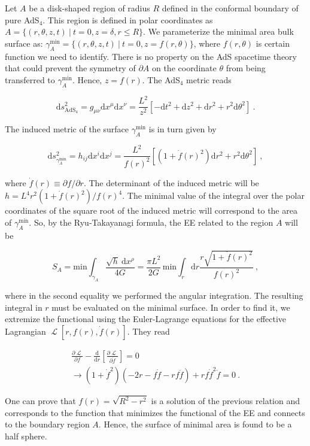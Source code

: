 \documentclass[twocolumn]{revtex4}
\providecommand{\eq}[2]{
    \begin{equation}
        #2
    \label{eq:#1}
    \end{equation}
}
\providecommand{\eqgat}[2]{
    \begin{gather}
        #2
    \label{eq:#1}
    \end{gather}
}
\DeclareMathOperator{\calL}{\mathcal{L}}
\begin{document}
Let $A$ be a disk-shaped region of radius $R$ defined in the conformal boundary of pure AdS$_4$. This region is defined in polar coordinates as
$
    A = \{ ( r, \theta, z, t ) \ | \ t = 0, z = \delta, r \le R \} 
$. 
We parameterize the minimal area bulk surface as:
$
    \gamma_A^\text{min} = \{ ( r, \theta, z, t ) \ | \ t = 0, z = f (r, \theta) \} %
$, 
where $f(r,\theta)$ is certain function we need to identify. There is no property on the AdS spacetime theory that could prevent the symmetry of $\partial A$ on the coordinate $\theta$ from being transferred to $\gamma_A^\text{min}$. Hence, $z=f(r)$.
The AdS$_4$ metric reads
\eq{1Ametric}{
    \mathrm{d}s^2_{\text{AdS}_4} = g_{\mu \nu} \mathrm{d}x^\mu \mathrm{d}x^\nu = 
    \frac{L^2}{z^2} [ -\mathrm{d}t^2 + \mathrm{d}z^2 + \mathrm{d}r^2 + r^2 \mathrm{d}\theta^2 ] \ . \nonumber
}
The induced metric of the surface $\gamma_A^\text{min}$ is in turn given by
\eq{1gammaAmetric}{
    \mathrm{d}s^2_{\gamma_A^\text{min}} = h_{i j} \mathrm{d}x^i \mathrm{d}x^j = 
    \frac{L^2}{f(r)^2} \left[ \left( 1+ \dot{f}(r)^2 \right) \mathrm{d}r^2 + r^2 \mathrm{d}\theta^2 \right] \ , \nonumber
}
where $ \dot{f}(r) \equiv \partial f/\partial r$. The determinant of the induced metric will be
$
    h = L^4 r^2 ( 1 + \dot{f}(r)^2 )/f(r)^4 
$.  
The minimal value of the integral over the polar coordinates of the square root of the induced metric will correspond to the area of $\gamma_A^\text{min}$. So, by the Ryu-Takayanagi formula, the EE related to the region $A$ will be
\eq{1EEA}{
    S_A = \text{min} \int_{\gamma_A}    \frac{\sqrt{h} \ \mathrm{d}x^\rho}{4G} = \frac{\pi L^2}{2G} \, \text{min} \int_r \mathrm{d}r \frac{r \sqrt{ 1 + \dot{f}(r)^2 }}{f(r)^2}  \ ,\nonumber
}
where in the second equality we performed the angular integration. The resulting integral in $r$ must be evaluated on the minimal surface. In order to find it, we extremize the functional using the 
Euler-Lagrange equations for the effective Lagrangian $\calL [r,f(r),\dot{f}(r)]$. They read
\eqgat{1EL}{
    \frac{\partial \calL}{\partial f} - \frac{\mathrm{d}}{\mathrm{d}r} \left[ \frac{\partial \calL}{\partial \dot{f}} \right] = 0 \nonumber \\
    \longrightarrow \left( 1+\dot{f}^2 \right) \left( -2r-f\dot{f}-rf\ddot{f} \right) + rf\dot{f}^2\ddot{f} = 0 \ .\nonumber
}
One can prove that $f(r) = \sqrt{R^2 - r^2}$ is a solution of the previous relation and corresponds to the function that minimizes the functional of the EE and connects to the boundary region $A$. Hence, the surface of minimal area is found to be a half sphere.
\end{document}
